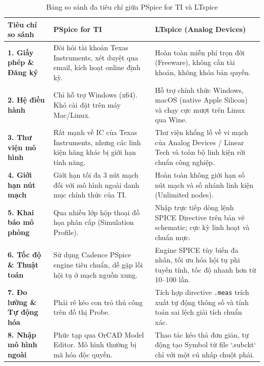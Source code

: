 \documentclass[12pt,a4paper]{report}
\begin{document}
\begin{table}[H]
\centering
\caption{Bảng so sánh đa tiêu chí giữa PSpice for TI và LTspice}
\label{tab:so_sanh_tools}
\renewcommand{\arraystretch}{1.2}
\small
\begin{tabularx}{\textwidth}{|p{3.2cm}|X|X|}
\hline
\rowcolor{codebg}
\textbf{Tiêu chí so sánh} & \textbf{PSpice for TI} & \textbf{LTspice (Analog Devices)} \\ \hline
\textbf{1. Giấy phép \& Đăng ký} & Đòi hỏi tài khoản Texas Instruments, xét duyệt qua email, kích hoạt online định kỳ. & Hoàn toàn miễn phí trọn đời (Freeware), không cần tài khoản, không khóa bản quyền. \\ \hline
\textbf{2. Hệ điều hành} & Chỉ hỗ trợ Windows (x64). Khó cài đặt trên máy Mac/Linux. & Hỗ trợ chính thức Windows, macOS (native Apple Silicon) và chạy cực mượt trên Linux qua Wine. \\ \hline
\textbf{3. Thư viện mô hình} & Rất mạnh về IC của Texas Instruments, nhưng các linh kiện hãng khác bị giới hạn tính năng. & Thư viện khổng lồ về vi mạch của Analog Devices / Linear Tech và toàn bộ linh kiện rời chuẩn công nghiệp. \\ \hline
\textbf{4. Giới hạn nút mạch} & Giới hạn tối đa 3 nút mạch đối với mô hình ngoài danh mục chính thức của TI. & Hoàn toàn không giới hạn số nút mạch và số nhánh linh kiện (Unlimited nodes). \\ \hline
\textbf{5. Khai báo mô phỏng} & Qua nhiều lớp hộp thoại đồ họa phân cấp (Simulation Profile). & Nhập trực tiếp dòng lệnh SPICE Directive trên bản vẽ schematic; cực kỳ linh hoạt và chuẩn mực. \\ \hline
\textbf{6. Tốc độ \& Thuật toán} & Sử dụng Cadence PSpice engine tiêu chuẩn, dễ gặp lỗi hội tụ ở mạch nguồn xung. & Engine SPICE tùy biến đa nhân, tối ưu hóa hội tụ phi tuyến tính, tốc độ nhanh hơn từ 10--100 lần. \\ \hline
\textbf{7. Đo lường \& Tự động hóa} & Phải rê kéo con trỏ thủ công trên đồ thị Probe. & Tích hợp directive \lstinline|.meas| trích xuất tự động thông số và tính toán sai lệch giải tích chuẩn xác. \\ \hline
\textbf{8. Nhập mô hình ngoài} & Phức tạp qua OrCAD Model Editor. Mô hình thường bị mã hóa độc quyền. & Thao tác kéo thả đơn giản, tự động tạo Symbol từ file `.subckt` chỉ với một cú nhấp chuột phải. \\ \hline
\end{tabularx}
\end{table}
\end{document}
